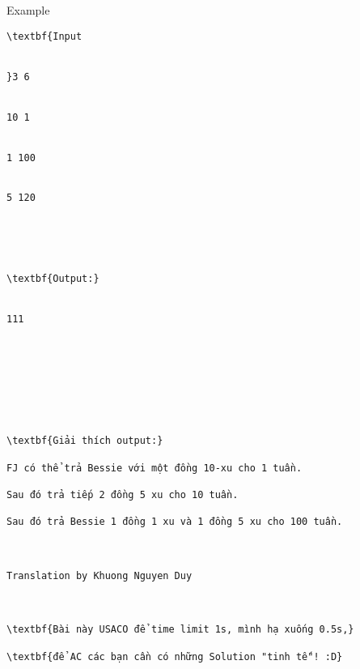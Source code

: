 Example
\begin{verbatim}
\textbf{Input


}3 6


10 1


1 100


5 120





\textbf{Output:}


111








\textbf{Giải thích output:}

FJ có thể trả Bessie với một đồng 10-xu cho 1 tuần.

Sau đó trả tiếp 2 đồng 5 xu cho 10 tuần.

Sau đó trả Bessie 1 đồng 1 xu và 1 đồng 5 xu cho 100 tuần.

 

Translation by Khuong Nguyen Duy

 

\textbf{Bài này USACO để time limit 1s, mình hạ xuống 0.5s,}

\textbf{để AC các bạn cần có những Solution "tinh tế"! :D}\end{verbatim}
